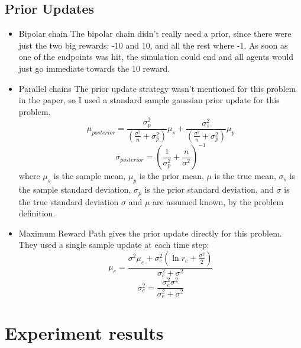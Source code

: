 \documentclass{article}
\begin{document}
\subsection{Prior Updates}

  \begin{itemize}
  \item Bipolar chain
  The bipolar chain didn't really need a prior, since there were just the two big rewards: -10 and 10, and all the rest where -1. As soon as one of the endpoints was hit, the simulation could end and all agents would just go immediate towards the 10 reward.
  
  \item Parallel chains
 The prior update strategy wasn't mentioned for this problem in the paper, so  I used a standard sample gaussian prior update for this problem.
 $$\mu_{posterior} = \frac{\sigma_p^2}{(\frac{\sigma^2}{n} + \sigma_p^2)} \mu_s + \frac{\sigma_s^2}{(\frac{\sigma^2}{n} + \sigma_p^2)} \mu_p$$
 $$\sigma_{posterior} = ( \frac{1}{\sigma_p^2} + \frac{n}{\sigma^2})^{-1}$$
 where $\mu_s$ is the sample mean, $\mu_p$ is the prior mean, $\mu$ is the true mean, $\sigma_s$ is the sample standard deviation, $\sigma_p$ is the prior standard deviation, and $\sigma$ is the true standard deviation $\sigma$ and $\mu$ are assumed known, by the problem definition.
  
  \item Maximum Reward Path
  \cite{SeedSampling} gives the prior update directly for this problem. They used a single sample update at each time step:
  $$\mu_e = \frac{\sigma^2 \mu_e + \sigma_e^2(\ln{r_e} + \frac{\sigma^2}{2}) }{\sigma_e^2+\sigma^2}$$
  $$\sigma_e^2 = \frac{\sigma_e^2 \sigma^2}{\sigma_e^2 + \sigma^2}$$
  \end{itemize}
    
\section{Experiment results}
\end{document}
